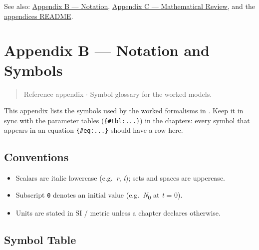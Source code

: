 \documentclass[
]{article}
\providecommand{\tightlist}{%
  \setlength{\itemsep}{0pt}\setlength{\parskip}{0pt}}
\theoremstyle{plain}
\theoremstyle{definition}
\begin{document}
See also: \href{appendix_notation.md}{Appendix B --- Notation},
\href{appendix_math_review.md}{Appendix C --- Mathematical Review}, and
the \href{README.md}{appendices README}.

\newpage

\section{Appendix B --- Notation and
Symbols}\label{sec:appendix_notation}

\begin{quote}
Reference appendix \texorpdfstring{\ensuremath{\cdot}}{.} Symbol glossary for the worked models.
\end{quote}

This appendix lists the symbols used by the worked formalisms in
\href{../../src/textbook/models.py}{}.
Keep it in sync with the parameter tables (\texttt{\{\#tbl:...\}}) in
the chapters: every symbol that appears in an equation
\texttt{\{\#eq:...\}} should have a row here.

\subsection{Conventions}\label{conventions}

\begin{itemize}
\tightlist
\item
  Scalars are italic lowercase (e.g.~\emph{r}, \emph{t}); sets and
  spaces are uppercase.
\item
  Subscript \texttt{0} denotes an initial value (e.g.~\emph{N}\texorpdfstring{\textsubscript{0}}{0} at
  \emph{t} = 0).
\item
  Units are stated in SI / metric unless a chapter declares otherwise.
\end{itemize}

\subsection{Symbol Table}\label{symbol-table}
\end{document}
